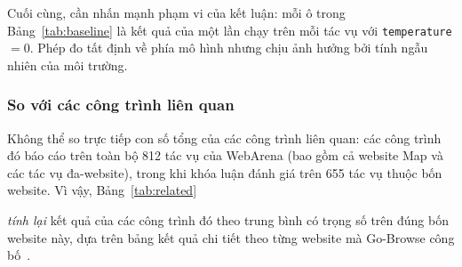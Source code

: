 Cuối cùng, cần nhấn mạnh phạm vi của kết luận: mỗi ô trong Bảng~\ref{tab:baseline} là kết quả của một lần chạy trên mỗi tác vụ với \texttt{temperature} $= 0$. Phép đo tất định về phía mô hình nhưng chịu ảnh hưởng bởi tính ngẫu nhiên của môi trường.

\subsubsection{So với các công trình liên quan}
Không thể so trực tiếp con số tổng của các công trình liên quan: các công trình đó báo cáo trên toàn bộ 812 tác vụ của WebArena (bao gồm cả website Map và các tác vụ đa-website), trong khi khóa luận đánh giá trên 655 tác vụ thuộc bốn website. Vì vậy, Bảng~\ref{tab:related}

\emph{tính lại} kết quả của các công trình đó theo trung bình có trọng số trên đúng bốn website này, dựa trên bảng kết quả chi tiết theo từng website mà Go-Browse công bố~\cite{gandhi2026gobrowse}.

